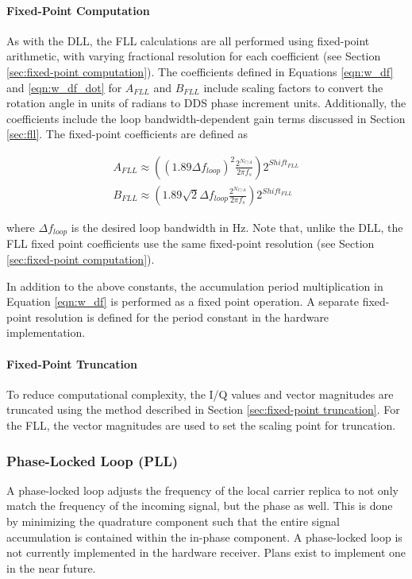 \documentclass[12pt]{article}
\begin{document}
\paragraph{Fixed-Point Computation}
As with the DLL, the FLL calculations are all performed using fixed-point arithmetic, with varying fractional resolution for each coefficient (see Section \ref{sec:fixed-point computation}). The coefficients defined in Equations \ref{eqn:w_df} and \ref{eqn:w_df_dot} for  $A_{FLL}$ and $B_{FLL}$ include scaling factors to convert the rotation angle in units of radians to DDS phase increment units. Additionally, the coefficients include the loop bandwidth-dependent gain terms discussed in Section \ref{sec:fll}. The fixed-point coefficients are defined as

\begin{gather*}
A_{FLL} \approx \left( (1.89 \Delta f_{loop})^2 \frac{2^{N_{C/A}}}{2 \pi f_{s}} \right) 2^{Shift_{FLL}} \\
B_{FLL} \approx \left( 1.89 \sqrt{2} \Delta f_{loop} \frac{2^{N_{C/A}}}{2 \pi f_{s}} \right) 2^{Shift_{FLL}}
\end{gather*}

where $\Delta f_{loop}$ is the desired loop bandwidth in Hz. Note that, unlike the DLL, the FLL fixed point coefficients use the same fixed-point resolution (see Section \ref{sec:fixed-point computation}).

In addition to the above constants, the accumulation period multiplication in Equation \ref{eqn:w_df} is performed as a fixed point operation. A separate fixed-point resolution is defined for the period constant in the hardware implementation.

\paragraph{Fixed-Point Truncation}
To reduce computational complexity, the I/Q values and vector magnitudes are truncated using the method described in Section \ref{sec:fixed-point truncation}. For the FLL, the vector magnitudes are used to set the scaling point for truncation.

\subsubsection{Phase-Locked Loop (PLL)}
A phase-locked loop adjusts the frequency of the local carrier replica to not only match the frequency of the incoming signal, but the phase as well. This is done by minimizing the quadrature component such that the entire signal accumulation is contained within the in-phase component. A phase-locked loop is not currently implemented in the hardware receiver. Plans exist to implement one in the near future.
\end{document}
